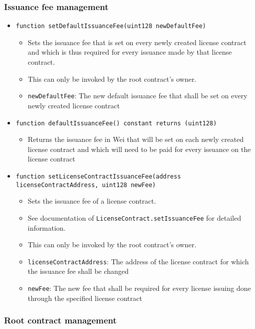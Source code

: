 \documentclass[a4paper]{article}
\begin{document}
\subsubsection{Issuance fee management}

\begin{itemize}
  \item \texttt{function setDefaultIssuanceFee(uint128 newDefaultFee)}
  \begin{itemize}
    \item Sets the issuance fee that is set on every newly created license contract and which is thus required for every issuance made by that license contract.
    \item This can only be invoked by the root contract's owner.
    \item \texttt{newDefaultFee}: The new default issuance fee that shall be set on every newly created license contract
  \end{itemize}
  
  \item \texttt{function defaultIssuanceFee() constant returns (uint128)}
  \begin{itemize}
    \item Returns the issuance fee in Wei that will be set on each newly created license contract and which will need to be paid for every issuance on the license contract
  \end{itemize}
  
  \item \texttt{function setLicenseContractIssuanceFee(address licenseContractAddress, uint128 newFee)}
  \begin{itemize}
    \item Sets the issuance fee of a license contract. 
    \item See documentation of \texttt{LicenseContract.setIssuanceFee} for detailed information.
    \item This can only be invoked by the root contract's owner.
    \item \texttt{licenseContractAddress}: The address of the license contract for which the issuance fee shall be changed
    \item \texttt{newFee}: The new fee that shall be required for every license issuing done through the specified license contract
  \end{itemize}
\end{itemize}

\subsubsection{Root contract management}
  
\end{document}
